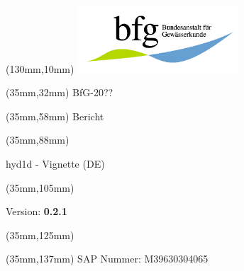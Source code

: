 \begin{titlepage}
    \begin{textblock*}{50mm}(130mm,10mm)
    \includegraphics[width=6cm]{latex/bfg_logo.jpg} %
    \end{textblock*}

    \begin{textblock*}{150mm}(35mm,32mm)
    \huge\noindent
    BfG-20??
    \end{textblock*}

    \begin{textblock*}{150mm}(35mm,58mm)
    \fontsize{30}{35}\selectfont\noindent
    Bericht
    \end{textblock*}

    \begin{textblock*}{150mm}(35mm,88mm)
    \fontsize{20}{25}\selectfont\noindent
    \begin{center}
    hyd1d - Vignette (DE)
    \end{center}
    \end{textblock*}

    \begin{textblock*}{150mm}(35mm,105mm)
    \fontsize{15}{17}\selectfont\noindent
    \begin{center}
    Version: \textbf{0.2.1}
    \end{center}
    \end{textblock*}

    \begin{textblock*}{150mm}(35mm,125mm)
    \fontsize{15}{17}\selectfont\noindent
    \mytoday
    \end{textblock*}


    \begin{textblock*}{150mm}(35mm,137mm)
    \fontsize{15}{17}\selectfont\noindent
    SAP Nummer: M39630304065
    \end{textblock*}


\end{titlepage}
